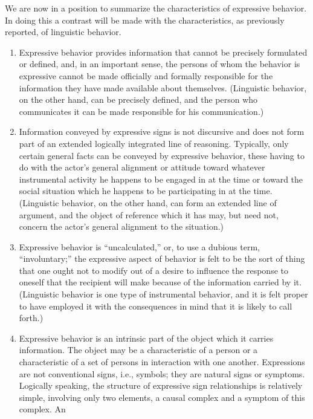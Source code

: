 \documentclass[twoside,symmetric,nobib,justified]{tufte-book}
\begin{document}
We are now in a position to summarize the characteristics of expressive
behavior. In doing this a contrast will be made with the
characteristics, as previously reported, of linguistic behavior.

\enlargethispage{\baselineskip}

\begin{enumerate}
\item
  Expressive behavior provides information that cannot be precisely
  formulated or defined, and, in an important sense, the persons of whom
  the behavior is expressive cannot be made officially and formally
  responsible for the information they have made available about
  themselves. (Linguistic behavior, on the other hand, can be precisely
  defined, and the person who communicates it can be made responsible
  for his communication.)
\item
  Information conveyed by expressive signs is not discursive and does
  not form part of an extended logically integrated line of reasoning.
  Typically, only certain general facts can be conveyed by expressive
  behavior, these having to do with the actor's general alignment or
  attitude toward whatever instrumental activity he happens to be
  engaged in at the time or toward the social situation which he happens
  to be participating in at the time. (Linguistic behavior, on the other
  hand, can form an extended line of argument, and the object of
  reference which it has may, but need not, concern the actor's general
  alignment to the situation.)
\item
  Expressive behavior is ``uncalculated,'' or, to use a dubious term,
  ``involuntary;'' the expressive aspect of behavior is felt to be the
  sort of thing that one ought not to modify out of a desire to
  influence the response to oneself that the recipient will make because
  of the information carried by it. (Linguistic behavior is one type of
  instrumental behavior, and it is felt proper to have employed it with
  the consequences in mind that it is likely to call forth.)
\item
  Expressive behavior is an intrinsic part of the object which it
  carries information. The object may be a characteristic of a person or
  a characteristic of a set of persons in interaction with one another.
  Expressions are not conventional signs, i.e., symbols; they are
  natural signs or symptoms. Logically speaking, the structure of
  expressive sign relationships is relatively simple, involving only two
  elements, a causal complex and a symptom of this complex. An

\end{enumerate}
\end{document}
